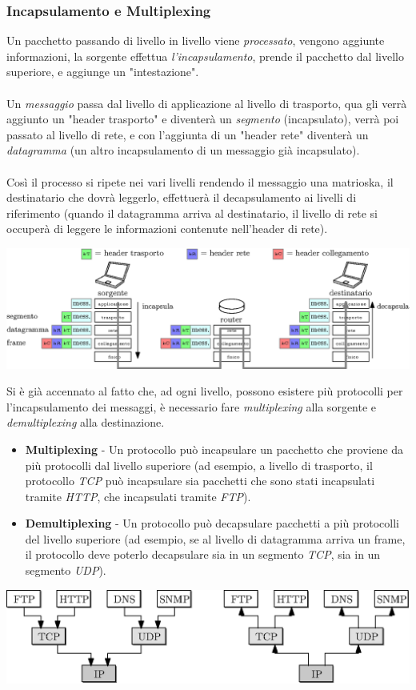 \documentclass[12pt, letterpaper]{article}
\newcommand{\acc}{\\\hphantom{}\\}
\begin{document}
\subsubsection{Incapsulamento e Multiplexing}
Un pacchetto passando di livello in livello viene \textit{processato}, vengono aggiunte informazioni, 
 la sorgente effettua \textit{l'incapsulamento}, prende il pacchetto dal livello superiore, 
 e aggiunge un "intestazione".\acc 
 Un \textit{messaggio} passa dal livello di applicazione al livello di trasporto, qua gli verrà aggiunto un 
 "header trasporto" e diventerà un \textit{segmento} (incapsulato), verrà poi passato al livello di rete, 
 e con l'aggiunta di un "header rete" diventerà un \textit{datagramma} (un altro incapsulamento di un 
 messaggio già incapsulato). \acc 
 Così il processo si ripete nei vari livelli rendendo il messaggio una matrioska, il destinatario 
 che dovrà leggerlo, effettuerà il decapsulamento ai livelli di riferimento (quando il datagramma arriva al 
 destinatario, il livello di rete si occuperà di leggere le informazioni contenute nell'header di rete).
 \begin{center}
    \includegraphics[width=1\textwidth ]{images/incapsulamento.eps}
\end{center}
Si è già accennato al fatto che, ad ogni livello, possono esistere più protocolli per l'incapsulamento 
dei messaggi, è necessario fare \textit{multiplexing} alla sorgente e \textit{demultiplexing} 
alla destinazione. \begin{itemize}
    \item \textbf{Multiplexing} - Un protocollo può incapsulare un pacchetto che proviene da più protocolli 
    dal livello superiore (ad esempio, a livello di trasporto, il protocollo \textit{TCP} può incapsulare 
    sia pacchetti che sono stati incapsulati tramite \textit{HTTP}, che incapsulati tramite \textit{FTP}).
    \item \textbf{Demultiplexing} - Un protocollo può decapsulare pacchetti a più protocolli del livello 
    superiore (ad esempio, se al livello di datagramma arriva un frame, il protocollo deve poterlo decapsulare sia 
    in un segmento \textit{TCP}, sia in un segmento \textit{UDP}).
\end{itemize} \begin{center}
    \includegraphics[width=1\textwidth ]{images/multiplexing.eps}
\end{center}
\end{document}
